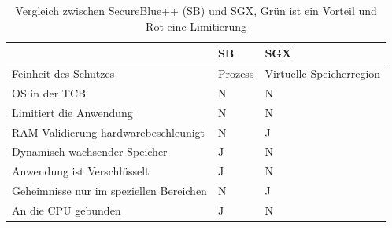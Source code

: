 \documentclass[ngerman]{sig-alternate-05-2015}
\begin{document}
\begin{table}[t]
	\centering
	\small
\begin{tabular}{|p{}|p{}|p{}|} \hline
	& SB & SGX \cite{mckeen2013innovative} \\
	\hline 
	
	Feinheit des Schutzes& \cellcolor{red!25}Prozess & \cellcolor{green!25}Virtuelle Speicherregion \\\hline
	OS in der TCB& 	\cellcolor{green!25}N& 	\cellcolor{green!25}N \\\hline
	Limitiert die Anwendung& 	\cellcolor{green!25}N& \cellcolor{green!25}N \\\hline
	RAM Validierung hardwarebeschleunigt & \cellcolor{red!25}N& \cellcolor{green!25}J \\\hline
	Dynamisch wachsender Speicher& \cellcolor{green!25}J & \cellcolor{red!25}N \\\hline
	Anwendung ist Verschlüsselt& \cellcolor{yellow!25}J& \cellcolor{yellow!25}N \\\hline
	Geheimnisse nur im speziellen Bereichen & \cellcolor{green!25}N  & \cellcolor{red!25}J\\\hline
	An die CPU gebunden & \cellcolor{red!25}J  & \cellcolor{green!25}N\\\hline
\end{tabular}
	\caption{Vergleich zwischen SecureBlue++ (SB) und SGX, Grün ist ein Vorteil und Rot eine Limitierung \cite{evtyushkin2014iso}}
\end{table}
\end{document}
